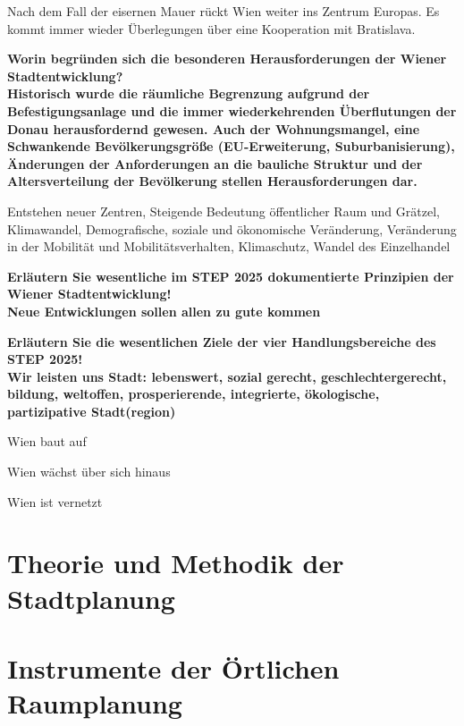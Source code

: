 \documentclass[]{article}
\newenvironment{question}{\vspace{3mm}\noindent\bfseries}{\\}
\begin{document}
Nach dem Fall der eisernen Mauer rückt Wien weiter ins Zentrum Europas. Es kommt immer wieder Überlegungen über eine Kooperation mit Bratislava.

\begin{question}
	Worin begründen sich die besonderen Herausforderungen der Wiener Stadtentwicklung?
\end{question}
Historisch wurde die räumliche Begrenzung aufgrund der Befestigungsanlage und die immer wiederkehrenden Überflutungen der Donau herausfordernd gewesen. Auch der Wohnungsmangel, eine Schwankende Bevölkerungsgröße (EU-Erweiterung, Suburbanisierung), Änderungen der Anforderungen an die bauliche Struktur und der Altersverteilung der Bevölkerung stellen Herausforderungen dar.

Entstehen neuer Zentren, Steigende Bedeutung öffentlicher Raum und Grätzel, Klimawandel, Demografische, soziale und ökonomische Veränderung, Veränderung in der Mobilität und Mobilitätsverhalten, Klimaschutz, Wandel des Einzelhandel

\begin{question}
	Erläutern Sie wesentliche im STEP 2025 dokumentierte Prinzipien der Wiener Stadtentwicklung!
\end{question}
Neue Entwicklungen sollen allen zu gute kommen

\begin{question}
	Erläutern Sie die wesentlichen Ziele der vier Handlungsbereiche des STEP 2025!
\end{question}
Wir leisten uns Stadt: lebenswert, sozial gerecht, geschlechtergerecht, bildung, weltoffen, prosperierende, integrierte, ökologische, partizipative Stadt(region)

Wien baut auf

Wien wächst über sich hinaus

Wien ist vernetzt

\section{Theorie und Methodik der Stadtplanung}

\section{Instrumente der Örtlichen Raumplanung}
\end{document}
